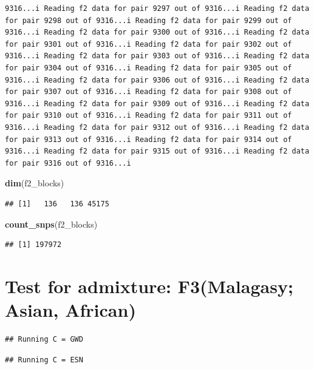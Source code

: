 \documentclass[
]{article}
\newenvironment{Shaded}{\begin{snugshade}}{\end{snugshade}}
\newcommand{\FunctionTok}[1]{\textcolor[rgb]{0.13,0.29,0.53}{\textbf{#1}}}
\newcommand{\NormalTok}[1]{#1}
\begin{document}
\begin{verbatim}
9316...i Reading f2 data for pair 9297 out of 9316...i Reading f2 data for pair 9298 out of 9316...i Reading f2 data for pair 9299 out of 9316...i Reading f2 data for pair 9300 out of 9316...i Reading f2 data for pair 9301 out of 9316...i Reading f2 data for pair 9302 out of 9316...i Reading f2 data for pair 9303 out of 9316...i Reading f2 data for pair 9304 out of 9316...i Reading f2 data for pair 9305 out of 9316...i Reading f2 data for pair 9306 out of 9316...i Reading f2 data for pair 9307 out of 9316...i Reading f2 data for pair 9308 out of 9316...i Reading f2 data for pair 9309 out of 9316...i Reading f2 data for pair 9310 out of 9316...i Reading f2 data for pair 9311 out of 9316...i Reading f2 data for pair 9312 out of 9316...i Reading f2 data for pair 9313 out of 9316...i Reading f2 data for pair 9314 out of 9316...i Reading f2 data for pair 9315 out of 9316...i Reading f2 data for pair 9316 out of 9316...i
\end{verbatim}

\begin{Shaded}
\begin{Highlighting}[]
\FunctionTok{dim}\NormalTok{(f2\_blocks)}
\end{Highlighting}
\end{Shaded}

\begin{verbatim}
## [1]   136   136 45175
\end{verbatim}

\begin{Shaded}
\begin{Highlighting}[]
\FunctionTok{count\_snps}\NormalTok{(f2\_blocks)}
\end{Highlighting}
\end{Shaded}

\begin{verbatim}
## [1] 197972
\end{verbatim}

\section{Test for admixture: F3(Malagasy; Asian,
African)}\label{test-for-admixture-f3malagasy-asian-african}

\begin{verbatim}
## Running C = GWD
\end{verbatim}

\begin{verbatim}
## Running C = ESN
\end{verbatim}
\end{document}

